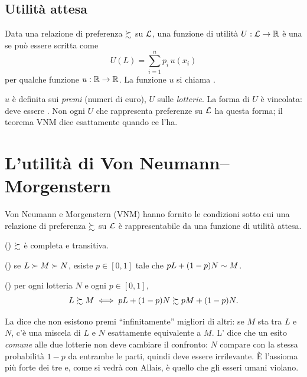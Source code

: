 \subsection{Utilità attesa}

\begin{definizione}
Data una relazione di preferenza $\succsim$ su $\mathcal{L}$, una funzione di utilità
$U : \mathcal{L} \to \mathbb{R}$ è una  se può essere scritta come
\[
  U(L) = \sum_{i=1}^{n} p_i\, u(x_i)
\]
per qualche funzione $u : \mathbb{R} \to \mathbb{R}$. La funzione $u$ si chiama
.
\end{definizione}

\begin{attenzione}
$u$ è definita sui \emph{premi} (numeri di euro), $U$ sulle \emph{lotterie}.
La forma di $U$ è vincolata: deve essere . Non ogni
$U$ che rappresenta preferenze su $\mathcal{L}$ ha questa forma; il teorema VNM dice
esattamente quando ce l'ha.
\end{attenzione}

\section{L'utilità di Von Neumann--Morgenstern}

Von Neumann e Morgenstern (VNM) hanno fornito le condizioni sotto cui una relazione di
preferenza $\succsim$ su $\mathcal{L}$ è rappresentabile da una funzione di utilità attesa.

\begin{definizione}
\begin{description}[leftmargin=2.2cm, style=nextline, font=\normalfont\bfseries]
  \item[Assioma 1] () $\succsim$ è completa e transitiva.
  \item[Assioma 2] () se $L \succ M \succ N$, esiste $p \in [0,1]$
        tale che $pL + (1-p)N \sim M$.
  \item[Assioma 3] () per ogni lotteria $N$ e ogni $p \in [0,1]$,
        \[ L \succsim M \iff pL + (1-p)N \succsim pM + (1-p)N. \]
\end{description}
\end{definizione}

\begin{osservazione}
La  dice che non esistono premi ``infinitamente'' migliori di altri:
se $M$ sta tra $L$ e $N$, c'è una miscela di $L$ e $N$ esattamente equivalente a $M$.
L' dice che un esito \emph{comune} alle due lotterie non deve
cambiare il confronto: $N$ compare con la stessa probabilità $1-p$ da entrambe le parti,
quindi deve essere irrilevante. È l'assioma più forte dei tre e, come si vedrà con
Allais, è quello che gli esseri umani violano.
\end{osservazione}

